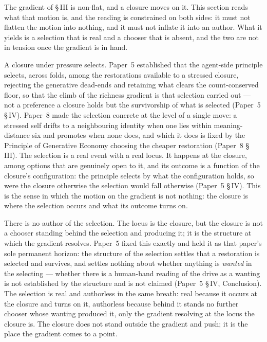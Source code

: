\documentclass[11pt,oneside]{report}
\theoremstyle{definition}
\theoremstyle{remark}
\begin{document}
The gradient of \S\,III is non-flat, and a closure moves on it. This section reads what that motion is, and the reading is constrained on both sides: it must not flatten the motion into nothing, and it must not inflate it into an author. What it yields is a selection that is real and a chooser that is absent, and the two are not in tension once the gradient is in hand.

A closure under pressure selects. Paper~5 established that the agent-side principle selects, across folds, among the restorations available to a stressed closure, rejecting the generative dead-ends and retaining what clears the count-conserved floor, so that the climb of the richness gradient is that selection carried out --- not a preference a closure holds but the survivorship of what is selected (Paper~5 \S\,IV). Paper~8 made the selection concrete at the level of a single move: a stressed self drifts to a neighbouring identity when one lies within meaning-distance six and promotes when none does, and which it does is fixed by the Principle of Generative Economy choosing the cheaper restoration (Paper~8 \S\,III). The selection is a real event with a real locus. It happens at the closure, among options that are genuinely open to it, and its outcome is a function of the closure's configuration: the principle selects by what the configuration holds, so were the closure otherwise the selection would fall otherwise (Paper~5 \S\,IV). This is the sense in which the motion on the gradient is not nothing: the closure is where the selection occurs and what its outcome turns on.

There is no author of the selection. The locus is the closure, but the closure is not a chooser standing behind the selection and producing it; it is the structure at which the gradient resolves. Paper~5 fixed this exactly and held it as that paper's sole permanent horizon: the structure of the selection settles that a restoration is selected and survives, and settles nothing about whether anything is \emph{wanted} in the selecting --- whether there is a human-band reading of the drive as a wanting is not established by the structure and is not claimed (Paper~5 \S\,IV, Conclusion). The selection is real and authorless in the same breath: real because it occurs at the closure and turns on it, authorless because behind it stands no further chooser whose wanting produced it, only the gradient resolving at the locus the closure is. The closure does not stand outside the gradient and push; it is the place the gradient comes to a point.
\end{document}
